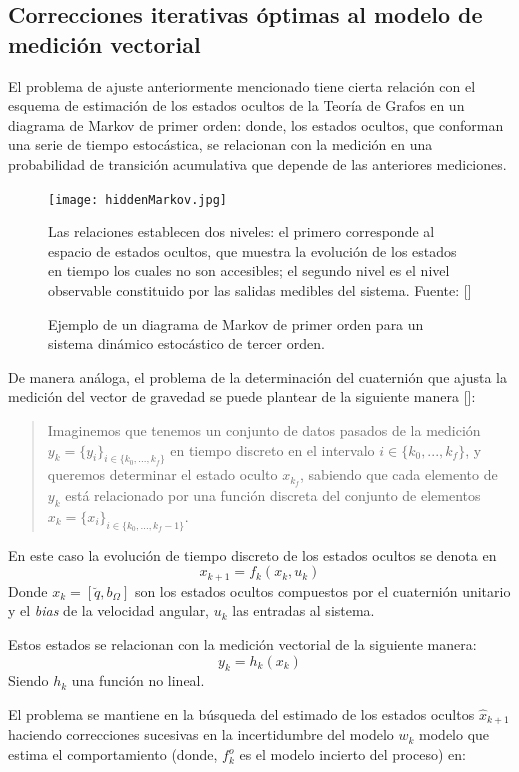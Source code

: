 \documentclass[10pt]{report}
\numberwithin{equation}{chapter}
\numberwithin{algorithm}{chapter}
\newcommand{\bcite}[1]{[\cite{#1}]}
\begin{document}
\subsection{Correcciones iterativas óptimas al modelo de medición vectorial}
El problema de ajuste anteriormente mencionado tiene cierta relación con el esquema de estimación de los estados ocultos de la Teoría de Grafos en un diagrama de Markov de primer orden: donde, los estados ocultos, que conforman una serie de tiempo estocástica, se relacionan con la medición en una probabilidad de transición acumulativa que depende de las anteriores mediciones.\par
\begin{figure}[t]
\texttt{[image: hiddenMarkov.jpg]}
\caption{Ejemplo de un diagrama de Markov de primer orden para un sistema dinámico estocástico de tercer orden.} \scriptsize{Las relaciones establecen dos niveles: el primero corresponde al espacio de estados ocultos, que muestra la evolución de los estados en tiempo los cuales no son accesibles; el segundo nivel es el nivel observable constituido por las salidas medibles del sistema. Fuente: [\cite{Perrin2003}]}
\label{recons_fig1}
\end{figure}
De manera análoga, el problema de la determinación del cuaternión que ajusta la medición del vector de gravedad se puede plantear de la siguiente manera \bcite{Merwe2004}: \begin{quote} Imaginemos que tenemos un conjunto de datos pasados de la medición $y_k=\{y_i\}_{i\in\{k_0,...,k_f\}}$ en tiempo discreto en el intervalo $i\in\{k_0,...,k_f\}$, y queremos determinar el estado oculto $x_{k_f}$, sabiendo que cada elemento de $y_k$ está relacionado por una función discreta del conjunto de elementos $x_k=\{x_i\}_{i\in\{k_0,...,k_f-1\}}$.\end{quote}
En este caso la evolución de tiempo discreto de los estados ocultos se denota en
\begin{equation}
\label{chap2:ecc1}
x_{k+1}=f_k(x_k,u_k)
\end{equation} 
Donde $x_k=[\breve{q},b_\Omega]$ son los estados ocultos compuestos por el cuaternión unitario y el \emph{bias} de la velocidad angular, $u_k$ las entradas al sistema. \par Estos estados se relacionan con la medición vectorial de la siguiente manera:
\begin{equation}
\label{chap2:ecc10}
y_{k}=h_k(x_k)
\end{equation} 
Siendo $h_k$ una función no lineal.\par El problema se mantiene en la búsqueda del estimado de los estados ocultos $\hat{x}_{k+1}$ haciendo correcciones sucesivas en la incertidumbre del modelo $w_k$ modelo que estima el comportamiento (donde, $f^o_k$ es el modelo incierto del proceso) en:
\end{document}
